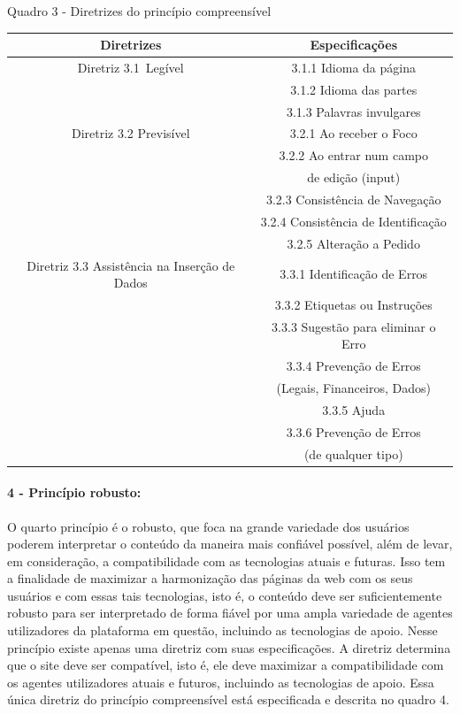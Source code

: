 \documentclass[a4paper]{article}
\begin{document}
\begin{titlepage}
Quadro 3 - Diretrizes do princípio compreensível\\[-1cm]
\begin{center}
	\fontsize{8pt}{8pt}\selectfont
	\begin{longtable}{|c|c|}
		\hline
		Diretrizes & Especificações \\
		\hline
		Diretriz 3.1 Legível& 3.1.1 Idioma da página\\
		& 3.1.2 Idioma das partes\\
		& 3.1.3 Palavras invulgares\\
		\hline
		Diretriz 3.2 Previsível & 3.2.1 Ao receber o Foco\\
		& 3.2.2 Ao entrar num campo\\
		& de edição (input)\\
		& 3.2.3 Consistência de Navegação\\
		& 3.2.4 Consistência de Identificação\\
		& 3.2.5 Alteração a Pedido\\
		\hline
		Diretriz 3.3 Assistência na Inserção de Dados& 3.3.1 Identificação de Erros\\
		& 3.3.2 Etiquetas ou Instruções\\
		& 3.3.3 Sugestão para eliminar o Erro\\
		& 3.3.4 Prevenção de Erros\\
		& (Legais, Financeiros, Dados)\\
		& 3.3.5 Ajuda\\
		& 3.3.6 Prevenção de Erros\\
		& (de qualquer tipo)\\
		\hline
	\end{longtable}
\end{center}

\paragraph{4 - Princípio robusto: }

O quarto princípio é o robusto, que foca na grande variedade dos usuários poderem interpretar o conteúdo da maneira mais confiável possível, além de levar, em consideração, a compatibilidade com as tecnologias atuais e futuras. Isso tem a finalidade de maximizar a harmonização das páginas da web com os seus usuários e com essas tais tecnologias, isto é, o conteúdo deve ser suficientemente robusto para ser interpretado de forma fiável por uma ampla variedade de agentes utilizadores da plataforma em questão, incluindo as tecnologias de apoio. Nesse princípio existe apenas uma diretriz com suas especificações. A diretriz determina que o site deve ser compatível, isto é, ele deve maximizar a compatibilidade com os agentes utilizadores atuais e futuros, incluindo as tecnologias de apoio. Essa única diretriz do princípio compreensível está especificada e descrita no quadro 4.


\end{titlepage}
\end{document}
